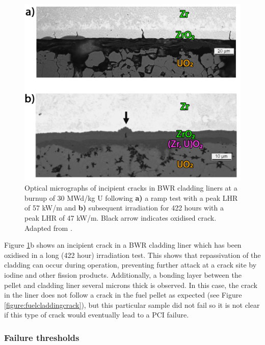 \begin{figure}[ht] %
\centering
\includegraphics[width=14.5cm]{images/linercracks.png}
\caption[Optical micrographs of incipient cracks in BWR cladding liners at a burnup of 30 MWd/kg U following \textbf{a)} a ramp test with a peak LHR of 57 kW/m and \textbf{b)} subsequent irradiation for 422 hours with a peak LHR of 47 kW/m. Black arrow indicates oxidised crack.]{Optical micrographs of incipient cracks in BWR cladding liners at a burnup of 30 MWd/kg U following \textbf{a)} a ramp test with a peak LHR of 57 kW/m and \textbf{b)} subsequent irradiation for 422 hours with a peak LHR of 47 kW/m. Black arrow indicates oxidised crack. Adapted from \cite{Kitano2006}.}
\label{figure:linercracks}
\end{figure}

Figure \ref{figure:linercracks}b shows an incipient crack in a BWR cladding liner which has been oxidised in a long (422 hour) irradiation test. This shows that repassivation of the cladding can occur during operation, preventing further attack at a crack site by iodine and other fission products. Additionally, a bonding layer between the pellet and cladding liner several microns thick is observed. In this case, the crack in the liner does not follow a crack in the fuel pellet as expected (see Figure \ref{figure:fuelcladdingcrack}), but this particular sample did not fail so it is not clear if this type of crack would eventually lead to a PCI failure. 

\subsubsection{Failure thresholds}

